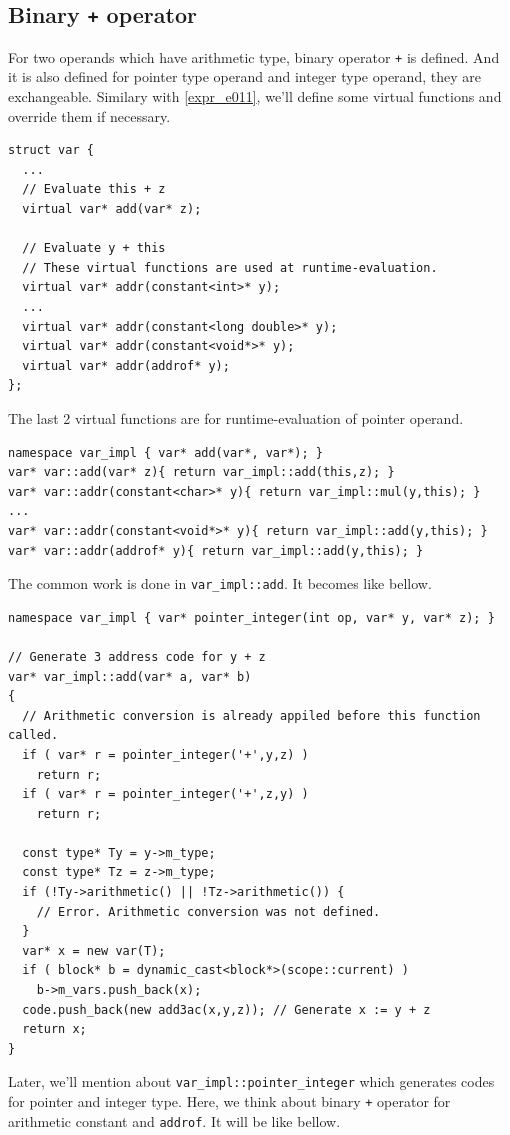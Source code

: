 \subsection{Binary {\tt{+}} operator}
\label{expr_e014}
For two operands which have arithmetic type, binary operator {\tt{+}}
is defined. And it is also defined for pointer type operand and integer type
operand, they are exchangeable. Similary with \ref{expr_e011}, we'll
define some virtual functions and override them if necessary.
\begin{verbatim}
struct var {
  ...
  // Evaluate this + z
  virtual var* add(var* z);

  // Evaluate y + this
  // These virtual functions are used at runtime-evaluation.
  virtual var* addr(constant<int>* y);
  ...
  virtual var* addr(constant<long double>* y);
  virtual var* addr(constant<void*>* y);
  virtual var* addr(addrof* y);
};
\end{verbatim}
The last 2 virtual functions are for runtime-evaluation of
pointer operand.
\begin{verbatim}
namespace var_impl { var* add(var*, var*); }
var* var::add(var* z){ return var_impl::add(this,z); }
var* var::addr(constant<char>* y){ return var_impl::mul(y,this); }
...
var* var::addr(constant<void*>* y){ return var_impl::add(y,this); }
var* var::addr(addrof* y){ return var_impl::add(y,this); }
\end{verbatim}
The common work is done in {\tt{var\_impl::add}}. It becomes like bellow.
\begin{verbatim}
namespace var_impl { var* pointer_integer(int op, var* y, var* z); }

// Generate 3 address code for y + z
var* var_impl::add(var* a, var* b)
{
  // Arithmetic conversion is already appiled before this function called.
  if ( var* r = pointer_integer('+',y,z) )
    return r;
  if ( var* r = pointer_integer('+',z,y) )
    return r;

  const type* Ty = y->m_type;
  const type* Tz = z->m_type;
  if (!Ty->arithmetic() || !Tz->arithmetic()) {
    // Error. Arithmetic conversion was not defined. 
  }
  var* x = new var(T);
  if ( block* b = dynamic_cast<block*>(scope::current) )
    b->m_vars.push_back(x);
  code.push_back(new add3ac(x,y,z)); // Generate x := y + z
  return x;
}
\end{verbatim}
Later, we'll mention about {\tt{var\_impl::pointer\_integer}}
which generates codes for pointer and integer type.
Here, we think about binary {\tt{+}} operator for
arithmetic constant and {\tt{addrof}}. It will be like bellow.
